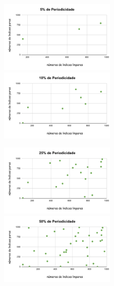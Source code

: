   \begin{figure}[H] 
            \centering
                \includegraphics[width=0.496\textwidth]{5PeriodicidadeJ.pdf}
                \includegraphics[width=0.496\textwidth]{10PeriodicidadeJ.pdf}
                 \label{fig:Desempenho}
        \end{figure}
          \begin{figure}[H] 
            \centering
                \includegraphics[width=0.496\textwidth]{25PeriodicidadeJ.pdf}
                \includegraphics[width=0.496\textwidth]{50PeriodicidadeJ.pdf}
                 \label{fig:Desempenho}
        \end{figure}
